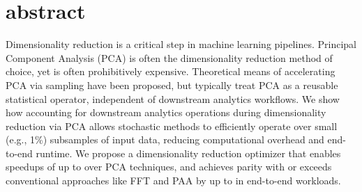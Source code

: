 \section*{abstract}
Dimensionality reduction is a critical step in machine learning pipelines. 
Principal Component Analysis (PCA) is often the dimensionality reduction method of choice, yet is often prohibitively expensive.
Theoretical means of accelerating PCA via sampling have been proposed, but typically treat PCA as a reusable statistical operator, independent of downstream analytics workflows.
We show how accounting for downstream analytics operations during dimensionality reduction via PCA allows stochastic methods to efficiently operate over small (e.g., 1\%) subsamples of input data, reducing computational overhead and end-to-end runtime. 
We propose a dimensionality reduction optimizer that enables speedups of up to \red{$5\times$} over  PCA techniques, and achieves parity with or exceeds conventional approaches like FFT and PAA by up to \red{$16\times$} in end-to-end workloads.






